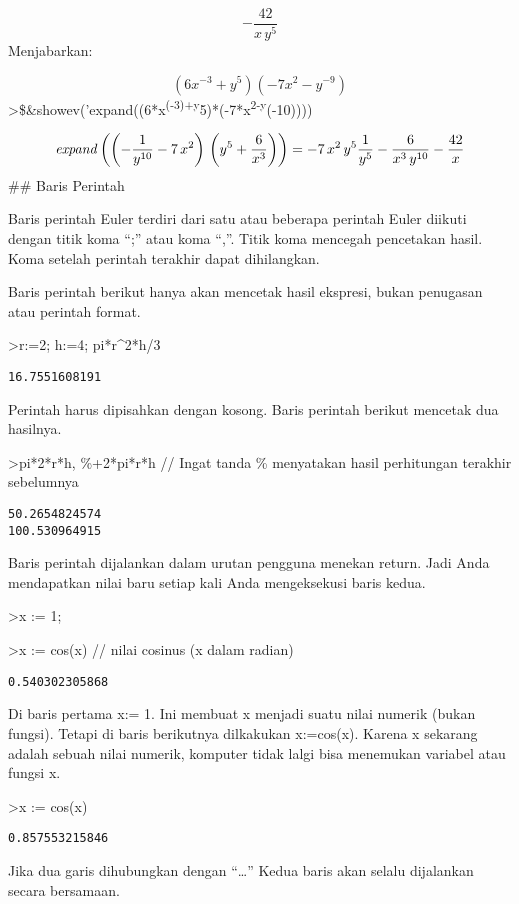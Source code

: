 \documentclass[
]{book}
\begin{document}
\[-\frac{42}{x\,y^5}\]Menjabarkan:

\[(6x^{-3}+y^5)(-7x^2-y^{-9})\]\textgreater\$\&showev('expand((6*x\textsuperscript{(-3)+y}5)*(-7*x\textsuperscript{2-y}(-10))))

\[{\it expand}\left(\left(-\frac{1}{y^{10}}-7\,x^2\right)\,\left(y^5+\frac{6}{x^3}\right)\right)=-7\,x^2\,y^5\frac{1}{y^5}-\frac{6}{x^3\,y^{10}}-\frac{42}{x}\]\#\# Baris Perintah

Baris perintah Euler terdiri dari satu atau beberapa perintah Euler diikuti dengan titik koma ``;'' atau koma ``,''. Titik koma mencegah pencetakan hasil. Koma setelah perintah terakhir dapat dihilangkan.

Baris perintah berikut hanya akan mencetak hasil ekspresi, bukan penugasan atau perintah format.

\textgreater r:=2; h:=4; pi*r\^{}2*h/3

\begin{verbatim}
16.7551608191
\end{verbatim}

Perintah harus dipisahkan dengan kosong. Baris perintah berikut mencetak dua hasilnya.

\textgreater pi*2*r*h, \%+2*pi*r*h // Ingat tanda \% menyatakan hasil perhitungan terakhir sebelumnya

\begin{verbatim}
50.2654824574
100.530964915
\end{verbatim}

Baris perintah dijalankan dalam urutan pengguna menekan return. Jadi Anda mendapatkan nilai baru setiap kali Anda mengeksekusi baris kedua.

\textgreater x := 1;

\textgreater x := cos(x) // nilai cosinus (x dalam radian)

\begin{verbatim}
0.540302305868
\end{verbatim}

Di baris pertama x:= 1. Ini membuat x menjadi suatu nilai numerik (bukan fungsi). Tetapi di baris berikutnya dilkakukan x:=cos(x). Karena x sekarang adalah sebuah nilai numerik, komputer tidak lalgi bisa menemukan variabel atau fungsi x.

\textgreater x := cos(x)

\begin{verbatim}
0.857553215846
\end{verbatim}

Jika dua garis dihubungkan dengan ``\ldots{}'' Kedua baris akan selalu dijalankan secara bersamaan.
\end{document}
